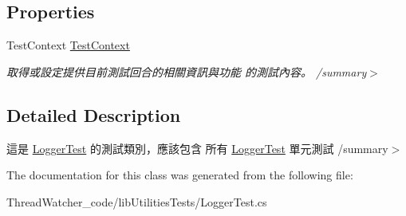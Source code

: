 \subsection*{Properties}
\begin{DoxyCompactItemize}
\item 
\hypertarget{classlib_utilities_tests_1_1_logger_test_ad4737441da655241298f6f7bcda3a6c3}{Test\+Context \hyperlink{classlib_utilities_tests_1_1_logger_test_ad4737441da655241298f6f7bcda3a6c3}{Test\+Context}}\label{classlib_utilities_tests_1_1_logger_test_ad4737441da655241298f6f7bcda3a6c3}

\begin{DoxyCompactList}\small\item\em 取得或設定提供目前測試回合的相關資訊與功能 的測試內容。 /summary$>$ \end{DoxyCompactList}\end{DoxyCompactItemize}


\subsection{Detailed Description}
這是 \hyperlink{classlib_utilities_tests_1_1_logger_test}{Logger\+Test} 的測試類別，應該包含 所有 \hyperlink{classlib_utilities_tests_1_1_logger_test}{Logger\+Test} 單元測試 /summary$>$ 

The documentation for this class was generated from the following file\+:\begin{DoxyCompactItemize}
\item 
Thread\+Watcher\+\_\+code/lib\+Utilities\+Tests/Logger\+Test.\+cs\end{DoxyCompactItemize}
